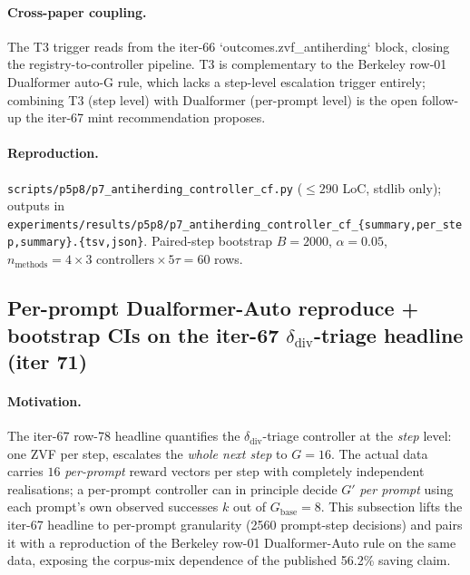 \documentclass{article}
\begin{document}
\paragraph{Cross-paper coupling.}
The T3 trigger reads from the iter-66 `outcomes.zvf\_antiherding` block,
closing the registry-to-controller pipeline. T3 is complementary to the
Berkeley row-01 Dualformer auto-G rule, which lacks a step-level
escalation trigger entirely; combining T3 (step level) with Dualformer
(per-prompt level) is the open follow-up the iter-67 mint
recommendation proposes.

\paragraph{Reproduction.}
\texttt{scripts/p5p8/p7\_antiherding\_controller\_cf.py}
($\leq 290$ LoC, stdlib only); outputs in
\texttt{experiments/results/p5p8/p7\_antiherding\_controller\_cf\_\{summary,per\_step,summary\}.\{tsv,json\}}.
Paired-step bootstrap $B{=}2000$, $\alpha{=}0.05$,
$n_{\mathrm{methods}}{=}4 \times 3 \text{ controllers} \times 5 \tau = 60$ rows.

\subsection{Per-prompt Dualformer-Auto reproduce + bootstrap CIs on
the iter-67 $\delta_{\mathrm{div}}$-triage headline (iter 71)}
\label{sec:p7-per-prompt-dualformer}

\paragraph{Motivation.}
The iter-67 row-78 headline quantifies the $\delta_{\mathrm{div}}$-triage
controller at the \emph{step} level: one ZVF per step, escalates the
\emph{whole next step} to $G{=}16$. The actual data carries $16$
\emph{per-prompt} reward vectors per step with completely independent
realisations; a per-prompt controller can in principle decide $G'$
\emph{per prompt} using each prompt's own observed successes $k$
out of $G_\text{base}{=}8$. This subsection lifts the iter-67 headline
to per-prompt granularity (2560 prompt-step decisions) and pairs it
with a reproduction of the Berkeley row-01 Dualformer-Auto rule on the
same data, exposing the corpus-mix dependence of the published 56.2\%
saving claim.
\end{document}
